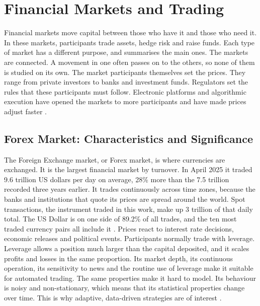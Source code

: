 \section{Financial Markets and Trading}

Financial markets move capital between those who have it and those who need it. In these markets, participants trade assets, hedge risk and raise funds. Each type of market has a different purpose, and  summarises the main ones. The markets are connected. A movement in one often passes on to the others, so none of them is studied on its own. The market participants themselves set the prices. They range from private investors to banks and investment funds. Regulators set the rules that these participants must follow. Electronic platforms and algorithmic execution have opened the markets to more participants and have made prices adjust faster \cite{brandimarte_introduction_2018}.



\subsection{Forex Market: Characteristics and Significance}

The Foreign Exchange market, or Forex market, is where currencies are exchanged. It is the largest financial market by turnover. In April 2025 it traded 9.6 trillion US dollars per day on average, 28\% more than the 7.5 trillion recorded three years earlier. It trades continuously across time zones, because the banks and institutions that quote its prices are spread around the world. Spot transactions, the instrument traded in this work, make up 3 trillion of that daily total. The US Dollar is on one side of 89.2\% of all trades, and the ten most traded currency pairs all include it \cite{bis_otc_2025}. Prices react to interest rate decisions, economic releases and political events. Participants normally trade with leverage. Leverage allows a position much larger than the capital deposited, and it scales profits and losses in the same proportion. Its market depth, its continuous operation, its sensitivity to news and the routine use of leverage make it suitable for automated trading. The same properties make it hard to model. Its behaviour is noisy and non-stationary, which means that its statistical properties change over time. This is why adaptive, data-driven strategies are of interest \cite{donnelly_art_2019}.

